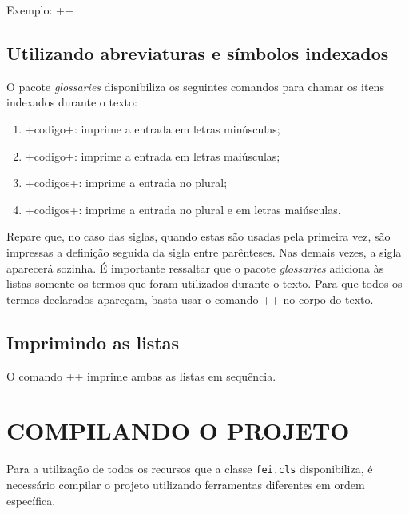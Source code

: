 \documentclass[xindy,draft]{fei}
\begin{document}
	Exemplo: \latexinline++

	\section{Utilizando abreviaturas e símbolos indexados}
	
	O pacote \emph{glossaries} disponibiliza os seguintes comandos para chamar os itens indexados durante o texto:
	
	\begin{enumerate}
	\item \latexinline+\gls{codigo}+: imprime a entrada em letras minúsculas;
	\item \latexinline+\Gls{codigo}+: imprime a entrada em letras maiúsculas;
	\item \latexinline+\glspl{codigo}+: imprime a entrada no plural;
	\item \latexinline+\Glspl{codigo}+: imprime a entrada no plural e em letras maiúsculas.
	\end{enumerate}
	
	Repare que, no caso das siglas, quando estas são usadas pela primeira vez, são impressas a definição seguida da sigla entre parênteses. Nas demais vezes, a sigla aparecerá sozinha. É importante ressaltar que o pacote \emph{glossaries} adiciona às listas somente os termos que foram utilizados durante o texto. Para que todos os termos declarados apareçam, basta usar o comando \latexinline+\glsaddall+ no corpo do texto.
	
	\section{Imprimindo as listas}
	
	O comando \latexinline+\printglossaries+ imprime ambas as listas em sequência.

	\chapter{COMPILANDO O PROJETO} \label{chap:compilando}
	
	Para a utilização de todos os recursos que a classe \texttt{fei.cls} disponibiliza, é necessário compilar o projeto utilizando ferramentas diferentes em ordem específica.
	
\end{document}
